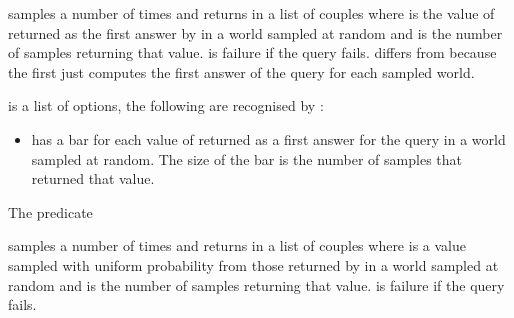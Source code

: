 \documentclass[letterpaper,10pt,english]{sphinxmanual}
\begin{document}
\sphinxAtStartPar
samples  a number of  times and returns in  a list of couples  where  is the value of  returned as the first answer by  in a world sampled at random and  is the number of samples returning that value.  is failure if the query fails.  differs from  because the first just computes the first answer of the query for each sampled world.

\sphinxAtStartPar
{} is a list of options, the following are recognised by :
\begin{itemize}
\item {} 
\sphinxAtStartPar
{}  has a bar for each value of  returned as a first answer for the query in a world sampled at random. The size of the bar is the number of samples that returned that value.

\end{itemize}

\sphinxAtStartPar
The predicate

\begin{sphinxVerbatim}[commandchars=\\\{\}]
  
\end{sphinxVerbatim}

\sphinxAtStartPar
samples  a number of  times and returns in  a list of couples  where  is a value sampled with uniform probability from those returned by  in a world sampled at random and  is the number of samples returning that value.
 is failure if the query fails.
\end{document}
